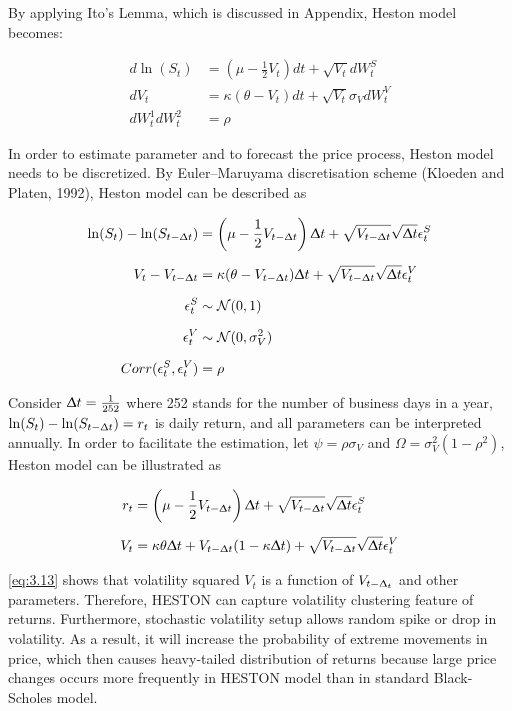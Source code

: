 \documentclass[12pt,a4paper]{article}
\numberwithin{equation}{section}
\begin{document}
By applying Ito's Lemma, which is discussed in Appendix, Heston model becomes:

\begin{align*}
d \ln(S_t) &= \left( \mu - \frac{1}{2}V_t \right) dt + \sqrt{V_t} dW_t^S \\[0.6em] 
dV_t &= \kappa (\theta - V_t) dt + \sqrt{V_t} \sigma_V dW_t^V \\[0.6em] 
dW_t^1 dW_t^2 &= \rho
\end{align*}

In order to estimate parameter and to forecast the price process, Heston model needs to be discretized. By Euler–Maruyama discretisation scheme (Kloeden and Platen, 1992), Heston model can be described as

\begin{align*}
\ln(S_t) - \ln(S_{t-\Updelta t}) &= \left( \mu - \frac{1}{2}V_{t-\Updelta t} \right) \Updelta t+ \sqrt{V_{t - \Updelta t}} \sqrt{\Updelta t} \epsilon_t^S\\[0.6em]
V_t - V_{t-\Updelta t} &= \kappa (\theta - V_{t- \Updelta t}) \Updelta t + \sqrt{V_{t - \Updelta t}} \sqrt{\Updelta t} \epsilon_t^V \\[0.6em] 
\epsilon_t^S &\sim \mathcal{N}(0, 1)\\[0.6em]
\epsilon_t^V &\sim \mathcal{N}(0, \sigma_V^2)\\[0.6em]
Corr(\epsilon_t^S, \epsilon_t^V) &= \rho
\end{align*}

Consider $\Updelta t = \frac{1}{252}$ where 252 stands for the number of business days in a year, $\ln(S_t) - \ln(S_{t-\Updelta t}) = r_t$ is daily return, and all parameters can be interpreted annually. In order to facilitate the estimation, let $\psi = \rho \sigma_V$ and $\Omega = \sigma_V^2(1-\rho^2)$, Heston model can be illustrated as 

 \begin{align}
r_t &= \left( \mu - \frac{1}{2}V_{t-\Updelta t} \right) \Updelta t+ \sqrt{V_{t - \Updelta t}} \sqrt{\Updelta t} \epsilon_t^S \label{eq:3.12} \\[0.6em] 
V_t &= \kappa \theta \Updelta t + V_{t- \Updelta t} (1 - \kappa \Updelta t)  + \sqrt{V_{t - \Updelta t}} \sqrt{\Updelta t} \epsilon_t^V \label{eq:3.13}
\end{align}

\eqref{eq:3.13} shows that volatility squared $V_t$ is a function of $V_{t-\Updelta_t}$ and other parameters. Therefore, HESTON can capture volatility clustering feature of returns. Furthermore, stochastic volatility setup allows random spike or drop in volatility. As a result, it will increase the probability of extreme movements in price, which then causes heavy-tailed distribution of returns because large price changes occurs more frequently in HESTON model than in standard Black-Scholes model. 
\end{document}
